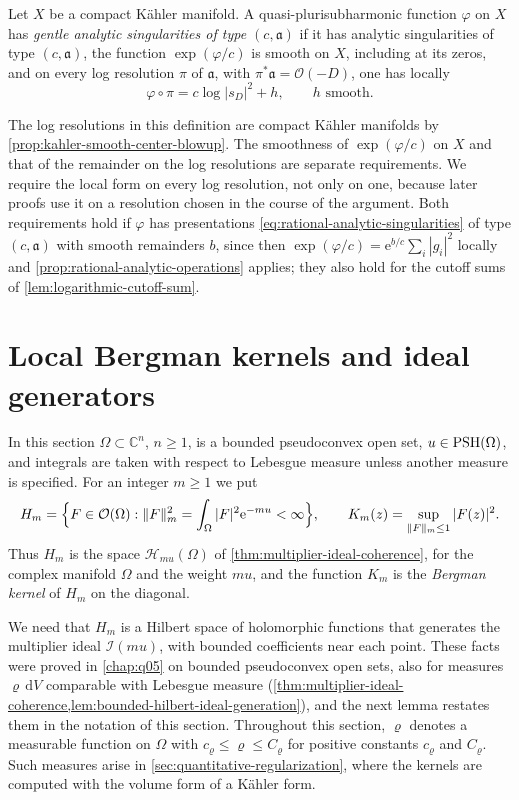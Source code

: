 \begin{definition}\label{def:gentle-analytic-singularities}
Let $X$ be a compact K\"ahler manifold. A quasi-plurisubharmonic function $\varphi$ on $X$ has \emph{gentle analytic singularities of type $(c,\mathfrak a)$} if it has analytic singularities of type $(c,\mathfrak a)$, the function $\exp(\varphi/c)$ is smooth on $X$, including at its zeros, and on every log resolution $\pi$ of $\mathfrak a$, with $\pi^*\mathfrak a=\mathcal O(-D)$, one has locally
\[
 \varphi\circ\pi=c\log|s_D|^2+h,\qquad h\text{ smooth}.
\]
\end{definition}

The log resolutions in this definition are compact K\"ahler manifolds by \cref{prop:kahler-smooth-center-blowup}. The smoothness of $\exp(\varphi/c)$ on $X$ and that of the remainder on the log resolutions are separate requirements. We require the local form on every log resolution, not only on one, because later proofs use it on a resolution chosen in the course of the argument. Both requirements hold if $\varphi$ has presentations \eqref{eq:rational-analytic-singularities} of type $(c,\mathfrak a)$ with smooth remainders $b$, since then $\exp(\varphi/c)=\mathrm e^{b/c}\sum_i|g_i|^2$ locally and \cref{prop:rational-analytic-operations} applies; they also hold for the cutoff sums of \cref{lem:logarithmic-cutoff-sum}.

\section{Local Bergman kernels and ideal generators}
\label{sec:local-bergman-approximation}

In this section $\Omega\subset\mathbb C^n$, $n\geq1$, is a bounded pseudoconvex open set, $u\in\mathrm{PSH}(\Omega)$, and integrals are taken with respect to Lebesgue measure unless another measure is specified. For an integer $m\geq1$ we put
\[
 H_m=\Bigl\{F\in\mathcal O(\Omega):\|F\|_m^2
                 =\int_\Omega|F|^2\mathrm e^{-mu}<\infty\Bigr\},\qquad
 K_m(z)=\sup_{\|F\|_m\leq1}|F(z)|^2.
\]
Thus $H_m$ is the space $\mathcal H_{mu}(\Omega)$ of \cref{thm:multiplier-ideal-coherence}, for the complex manifold $\Omega$ and the weight $mu$, and the function $K_m$ is the \emph{Bergman kernel} of $H_m$ on the diagonal.

We need that $H_m$ is a Hilbert space of holomorphic functions that generates the multiplier ideal $\mathcal I(mu)$, with bounded coefficients near each point. These facts were proved in \cref{chap:q05} on bounded pseudoconvex open sets, also for measures $\varrho\,\mathrm dV$ comparable with Lebesgue measure (\cref{thm:multiplier-ideal-coherence,lem:bounded-hilbert-ideal-generation}), and the next lemma restates them in the notation of this section. Throughout this section, $\varrho$ denotes a measurable function on $\Omega$ with $c_\varrho\leq\varrho\leq C_\varrho$ for positive constants $c_\varrho$ and $C_\varrho$. Such measures arise in \cref{sec:quantitative-regularization}, where the kernels are computed with the volume form of a K\"ahler form.

